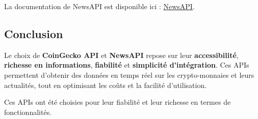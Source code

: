 \documentclass[a4paper,11pt]{article}
\begin{document}
La documentation de NewsAPI est disponible ici : \href{https://newsapi.org/}{NewsAPI}.

\subsection{Conclusion}
Le choix de \textbf{CoinGecko API} et \textbf{NewsAPI} repose sur leur \textbf{accessibilit\'e}, \textbf{richesse en informations}, \textbf{fiabilit\'e} et \textbf{simplicit\'e d’int\'egration}. Ces APIs permettent d’obtenir des donn\'ees en temps r\'eel sur les crypto-monnaies et leurs actualit\'es, tout en optimisant les co\^uts et la facilit\'e d’utilisation.


Ces APIs ont été choisies pour leur fiabilité et leur richesse en termes de fonctionnalités.
\end{document}

